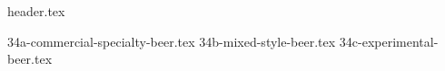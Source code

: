\clearpage
{}
\divisorLine
{header.tex}
\begin{multicols*}{2}
{34a-commercial-specialty-beer.tex}
{34b-mixed-style-beer.tex}
{34c-experimental-beer.tex}
\end{multicols*}